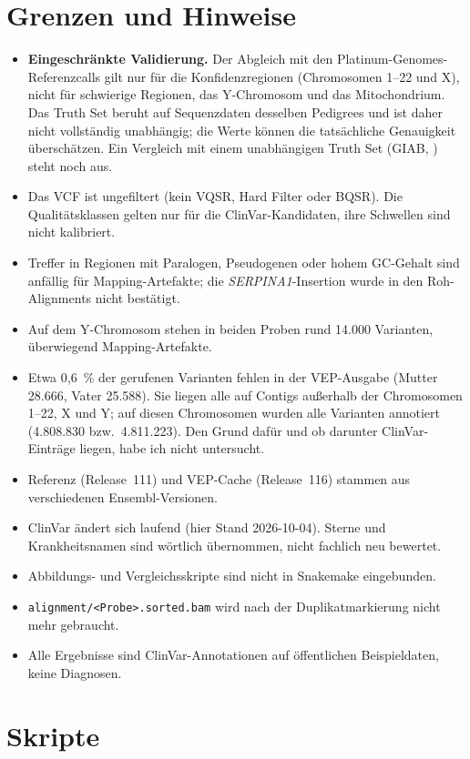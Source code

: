 \documentclass[10pt,a4paper,twocolumn]{article}
\newcommand{\gene}[1]{\textit{#1}}
\begin{document}
\section{Grenzen und Hinweise}
\begin{itemize}
\item \textbf{Eingeschränkte Validierung.} Der Abgleich mit den Platinum-Genomes-Referenzcalls gilt nur für die Konfidenzregionen (Chromosomen 1--22 und X), nicht für schwierige Regionen, das Y-Chromosom und das Mitochondrium. Das Truth Set beruht auf Sequenzdaten desselben Pedigrees \citep{eberle2017} und ist daher nicht vollständig unabhängig; die Werte können die tatsächliche Genauigkeit überschätzen. Ein Vergleich mit einem unabhängigen Truth Set (GIAB, \citealp{zook2014}) steht noch aus.
\item Das VCF ist ungefiltert (kein VQSR, Hard Filter oder BQSR). Die Qualitätsklassen gelten nur für die ClinVar-Kandidaten, ihre Schwellen sind nicht kalibriert.
\item Treffer in Regionen mit Paralogen, Pseudogenen oder hohem GC-Gehalt sind anfällig für Mapping-Artefakte; die \gene{SERPINA1}-Insertion wurde in den Roh-Alignments nicht bestätigt.
\item Auf dem Y-Chromosom stehen in beiden Proben rund 14.000 Varianten, überwiegend Mapping-Artefakte.
\item Etwa 0,6~\% der gerufenen Varianten fehlen in der VEP-Ausgabe (Mutter 28.666, Vater 25.588). Sie liegen alle auf Contigs außerhalb der Chromosomen 1--22, X und Y; auf diesen Chromosomen wurden alle Varianten annotiert (4.808.830 bzw.\ 4.811.223). Den Grund dafür und ob darunter ClinVar-Einträge liegen, habe ich nicht untersucht.
\item Referenz (Release~111) und VEP-Cache (Release~116) stammen aus verschiedenen Ensembl-Versionen.
\item ClinVar ändert sich laufend (hier Stand 2026-10-04). Sterne und Krankheitsnamen sind wörtlich übernommen, nicht fachlich neu bewertet.
\item Abbildungs- und Vergleichsskripte sind nicht in Snakemake eingebunden.
\item \texttt{alignment/<Probe>.sorted.bam} wird nach der Duplikatmarkierung nicht mehr gebraucht.
\item Alle Ergebnisse sind ClinVar-Annotationen auf öffentlichen Beispieldaten, keine Diagnosen.
\end{itemize}
 
\appendix
\section{Skripte}
\end{document}
